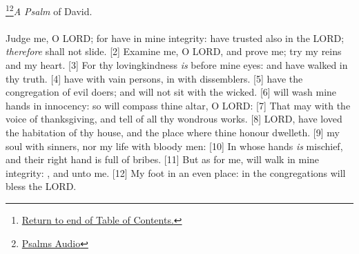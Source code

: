 \footnote{\textcolor[cmyk]{0.99998,1,0,0}{\hyperlink{TOC}{Return to end of Table of Contents.}}}\footnote{\href{https://www.audioverse.org/english/audiobibles/books/ENGKJV/O/Ps/1}{\textcolor[cmyk]{0.99998,1,0,0}{Psalms Audio}}}\textcolor[cmyk]{0.99998,1,0,0}{\emph{A Psalm} of David.}\\
\\
\textcolor[cmyk]{0.99998,1,0,0}{Judge me, O LORD; for  have  in mine integrity:  have trusted also in the LORD; \emph{therefore}  shall not slide.}
[2] \textcolor[cmyk]{0.99998,1,0,0}{Examine me, O LORD, and prove me; try my reins and my heart.}
[3] \textcolor[cmyk]{0.99998,1,0,0}{For thy lovingkindness \emph{is} before mine eyes: and  have walked in thy truth.}
[4] \textcolor[cmyk]{0.99998,1,0,0}{ have  with vain persons,  in with dissemblers.}
[5] \textcolor[cmyk]{0.99998,1,0,0}{ have  the congregation of evil doers; and will not sit with the wicked.}
[6] \textcolor[cmyk]{0.99998,1,0,0}{ will wash mine hands in innocency: so will  compass thine altar, O LORD:}
[7] \textcolor[cmyk]{0.99998,1,0,0}{That  may  with the voice of thanksgiving, and tell of all thy wondrous works.}
[8] \textcolor[cmyk]{0.99998,1,0,0}{LORD,  have loved the habitation of thy house, and the place where thine honour dwelleth.}
[9] \textcolor[cmyk]{0.99998,1,0,0}{ my soul with sinners, nor my life with bloody men:}
[10] \textcolor[cmyk]{0.99998,1,0,0}{In whose hands \emph{is} mischief, and their right hand is full of bribes.}
[11] \textcolor[cmyk]{0.99998,1,0,0}{But as for me,  will walk in mine integrity: , and  unto me.}
[12] \textcolor[cmyk]{0.99998,1,0,0}{My foot  in an even place: in the congregations will  bless the LORD.}
